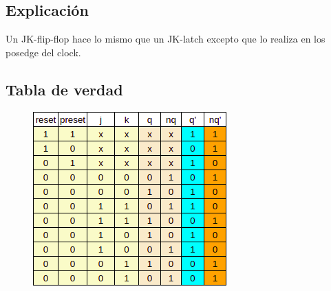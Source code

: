 \subsection*{Explicación}
Un JK-flip-flop hace lo mismo que un JK-latch excepto que lo realiza en los posedge del clock.

\subsection*{Tabla de verdad}
\begin{figure}[h]
    \centering
    \includegraphics{fotos/TruthTable/arki-lab2-TT_jkflipflop.png}
\end{figure}





